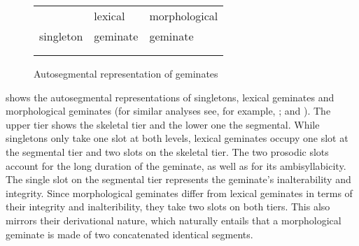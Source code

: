 \begin{figure}[h]
	\centering	
	
	\begin{tabularx}{.8\linewidth}{YYY}
		
		&		lexical			 & 		 morphological \\
		
		singleton	&			  geminate	 & 			  geminate\\		
		\\

		\begin{tikzpicture}[grow'=up]
		\Tree [.C C ] 					
		\end{tikzpicture}												&
		
		
		\begin{tikzpicture}[grow'=up]
		\Tree  [.C C C ];
		\end{tikzpicture}			
		&
		
		\begin{tikzpicture}[grow'=up]
		\Tree  [.C C ]
		\end{tikzpicture}
		\begin{tikzpicture}[grow'=up]
		\Tree  [.C C ]
		\end{tikzpicture}		
	\end{tabularx}
	
	\caption{Autosegmental representation of geminates}
	 \label{fig:Autosegmental representation of geminates} 

\end{figure}

 shows the autosegmental representations of singletons,  lexical geminates and  morphological geminates (for similar analyses see, for example,  \citealt[413]{Kenstowicz.1994}; \citealt[26f.]{Gussmann.2002} and \citealt[62]{Ridouane.2010}). The upper tier shows the skeletal tier and the lower one the segmental. While singletons only take one slot at both levels,  lexical geminates occupy one slot at the segmental tier and two slots on the skeletal tier. The two prosodic slots account for the long duration of the geminate, as well as for its ambisyllabicity. The single slot on the segmental tier represents the {geminate's} inalterability and integrity. Since  morphological geminates differ from  lexical geminates in terms of their integrity and inalteribility, they take two slots on both tiers. This also mirrors their derivational nature, which naturally entails that a {morphological geminate} is made of two concatenated identical segments.


